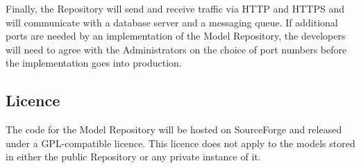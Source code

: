 Finally, the Repository will send and receive traffic via HTTP and HTTPS and will communicate with a database server and a messaging queue. If additional ports are needed by an implementation of the \ddmore Model Repository, the developers will need to agree with the Administrators on the choice of port numbers before the implementation goes into production. 

\subsection{Licence}
\label{licence}
The code for the \ddmore Model Repository will be hosted on SourceForge and released under a GPL-compatible licence. This licence does not apply to the models stored in either the public Repository or any private instance of it. 
